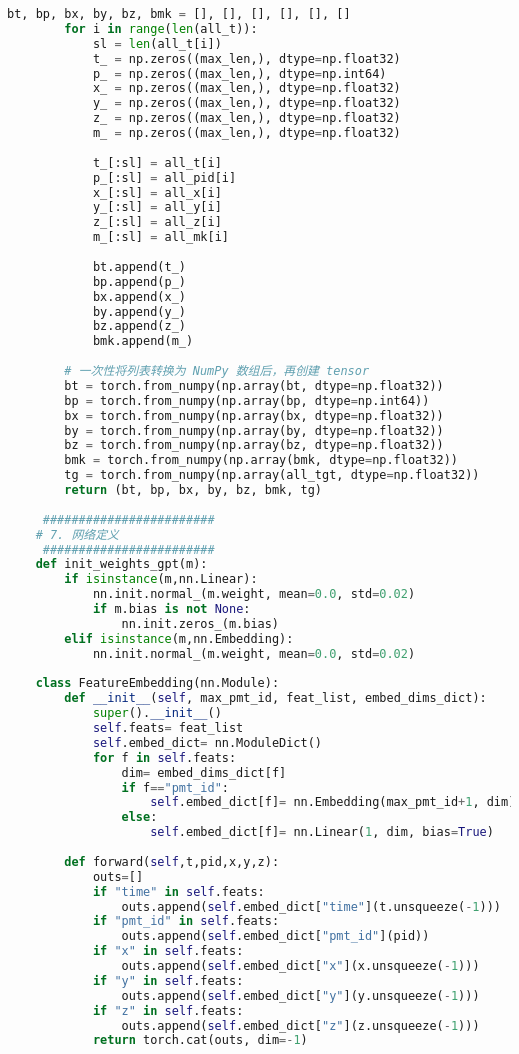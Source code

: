 \begin{lstlisting}[language=Python, caption={模型训练、验证与测试对比脚本 (train\_val\_test\_compare\_v1.py)}, label={lst:train_script}]
        bt, bp, bx, by, bz, bmk = [], [], [], [], [], []
        for i in range(len(all_t)):
            sl = len(all_t[i])
            t_ = np.zeros((max_len,), dtype=np.float32)
            p_ = np.zeros((max_len,), dtype=np.int64)
            x_ = np.zeros((max_len,), dtype=np.float32)
            y_ = np.zeros((max_len,), dtype=np.float32)
            z_ = np.zeros((max_len,), dtype=np.float32)
            m_ = np.zeros((max_len,), dtype=np.float32)
    
            t_[:sl] = all_t[i]
            p_[:sl] = all_pid[i]
            x_[:sl] = all_x[i]
            y_[:sl] = all_y[i]
            z_[:sl] = all_z[i]
            m_[:sl] = all_mk[i]
    
            bt.append(t_)
            bp.append(p_)
            bx.append(x_)
            by.append(y_)
            bz.append(z_)
            bmk.append(m_)
    
        # 一次性将列表转换为 NumPy 数组后，再创建 tensor
        bt = torch.from_numpy(np.array(bt, dtype=np.float32))
        bp = torch.from_numpy(np.array(bp, dtype=np.int64))
        bx = torch.from_numpy(np.array(bx, dtype=np.float32))
        by = torch.from_numpy(np.array(by, dtype=np.float32))
        bz = torch.from_numpy(np.array(bz, dtype=np.float32))
        bmk = torch.from_numpy(np.array(bmk, dtype=np.float32))
        tg = torch.from_numpy(np.array(all_tgt, dtype=np.float32))
        return (bt, bp, bx, by, bz, bmk, tg)
    
     ########################
    # 7. 网络定义
     ########################
    def init_weights_gpt(m):
        if isinstance(m,nn.Linear):
            nn.init.normal_(m.weight, mean=0.0, std=0.02)
            if m.bias is not None:
                nn.init.zeros_(m.bias)
        elif isinstance(m,nn.Embedding):
            nn.init.normal_(m.weight, mean=0.0, std=0.02)
    
    class FeatureEmbedding(nn.Module):
        def __init__(self, max_pmt_id, feat_list, embed_dims_dict):
            super().__init__()
            self.feats= feat_list
            self.embed_dict= nn.ModuleDict()
            for f in self.feats:
                dim= embed_dims_dict[f]
                if f=="pmt_id":
                    self.embed_dict[f]= nn.Embedding(max_pmt_id+1, dim)
                else:
                    self.embed_dict[f]= nn.Linear(1, dim, bias=True)
    
        def forward(self,t,pid,x,y,z):
            outs=[]
            if "time" in self.feats:
                outs.append(self.embed_dict["time"](t.unsqueeze(-1)))
            if "pmt_id" in self.feats:
                outs.append(self.embed_dict["pmt_id"](pid))
            if "x" in self.feats:
                outs.append(self.embed_dict["x"](x.unsqueeze(-1)))
            if "y" in self.feats:
                outs.append(self.embed_dict["y"](y.unsqueeze(-1)))
            if "z" in self.feats:
                outs.append(self.embed_dict["z"](z.unsqueeze(-1)))
            return torch.cat(outs, dim=-1)
    

\end{lstlisting}
